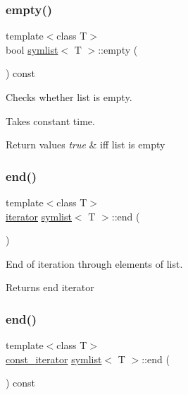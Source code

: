 \subsubsection{\texorpdfstring{empty()}{empty()}}
{\footnotesize\ttfamily template$<$class T$>$ \\
bool \mbox{\hyperlink{classsymlist}{symlist}}$<$ T $>$\+::empty (\begin{DoxyParamCaption}{ }\end{DoxyParamCaption}) const\hspace{0.3cm}{\ttfamily [inline]}}



Checks whether list is empty. 

Takes constant time.


\begin{DoxyRetVals}{Return values}
{\em true} & iff list is empty \\
\hline
\end{DoxyRetVals}
\mbox{\label{classsymlist_a7283589fa01f79d722f8256d7a6a7883}} 
\subsubsection{\texorpdfstring{end()}{end()}\hspace{0.1cm}{\footnotesize\ttfamily [1/2]}}
{\footnotesize\ttfamily template$<$class T$>$ \\
\mbox{\hyperlink{structsymlist__iterator}{iterator}} \mbox{\hyperlink{classsymlist}{symlist}}$<$ T $>$\+::end (\begin{DoxyParamCaption}{ }\end{DoxyParamCaption})\hspace{0.3cm}{\ttfamily [inline]}}



End of iteration through elements of list. 

\begin{DoxyReturn}{Returns}
end iterator 
\end{DoxyReturn}
\mbox{\label{classsymlist_a189c41a13b3dd377c113d802258ef418}} 
\subsubsection{\texorpdfstring{end()}{end()}\hspace{0.1cm}{\footnotesize\ttfamily [2/2]}}
{\footnotesize\ttfamily template$<$class T$>$ \\
\mbox{\hyperlink{structsymlist__iterator}{const\+\_\+iterator}} \mbox{\hyperlink{classsymlist}{symlist}}$<$ T $>$\+::end (\begin{DoxyParamCaption}{ }\end{DoxyParamCaption}) const\hspace{0.3cm}{\ttfamily [inline]}}



